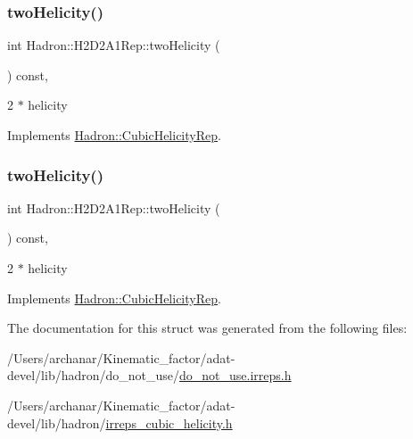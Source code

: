 \subsubsection{\texorpdfstring{twoHelicity()}{twoHelicity()}\hspace{0.1cm}{\footnotesize\ttfamily [2/3]}}
{\footnotesize\ttfamily int Hadron\+::\+H2\+D2\+A1\+Rep\+::two\+Helicity (\begin{DoxyParamCaption}{ }\end{DoxyParamCaption}) const\hspace{0.3cm}{\ttfamily [inline]}, {\ttfamily [virtual]}}

2 $\ast$ helicity 

Implements \mbox{\hyperlink{structHadron_1_1CubicHelicityRep_af507aa56fc2747eacc8cb6c96db31ecc}{Hadron\+::\+Cubic\+Helicity\+Rep}}.

\mbox{\label{structHadron_1_1H2D2A1Rep_a9e33338f0582361895bc7b7853741335}} 
\subsubsection{\texorpdfstring{twoHelicity()}{twoHelicity()}\hspace{0.1cm}{\footnotesize\ttfamily [3/3]}}
{\footnotesize\ttfamily int Hadron\+::\+H2\+D2\+A1\+Rep\+::two\+Helicity (\begin{DoxyParamCaption}{ }\end{DoxyParamCaption}) const\hspace{0.3cm}{\ttfamily [inline]}, {\ttfamily [virtual]}}

2 $\ast$ helicity 

Implements \mbox{\hyperlink{structHadron_1_1CubicHelicityRep_af507aa56fc2747eacc8cb6c96db31ecc}{Hadron\+::\+Cubic\+Helicity\+Rep}}.



The documentation for this struct was generated from the following files\+:\begin{DoxyCompactItemize}
\item 
/\+Users/archanar/\+Kinematic\+\_\+factor/adat-\/devel/lib/hadron/do\+\_\+not\+\_\+use/\mbox{\hyperlink{adat-devel_2lib_2hadron_2do__not__use_2do__not__use_8irreps_8h}{do\+\_\+not\+\_\+use.\+irreps.\+h}}\item 
/\+Users/archanar/\+Kinematic\+\_\+factor/adat-\/devel/lib/hadron/\mbox{\hyperlink{adat-devel_2lib_2hadron_2irreps__cubic__helicity_8h}{irreps\+\_\+cubic\+\_\+helicity.\+h}}\end{DoxyCompactItemize}
